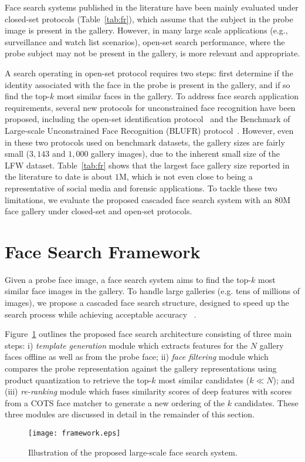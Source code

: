 \documentclass[10pt,journal,compsoc]{IEEEtran}
\begin{document}
Face search systems published in the literature have been mainly evaluated under closed-set protocols (Table~\ref{tab:fr}), which assume that the subject in the probe image is present in the gallery. However, in many large scale applications (e.g., surveillance and watch list scenarios), open-set search performance, where the probe subject may not be present in the gallery, is more relevant and appropriate.

A search operating in open-set protocol requires two steps: first determine if the identity associated with the face in the probe is present in the gallery, and if so find the top-$k$ most similar faces in the gallery. To address face search application requirements, several new protocols for unconstrained face recognition have been proposed, including the open-set identification protocol~\cite{faceretrieval:fusion} and the Benchmark of Large-scale Unconstrained Face Recognition (BLUFR) protocol~\cite{BLUFR}. However, even in these two protocols used on benchmark datasets, the gallery sizes are fairly small ($3,143$ and $1,000$ gallery images), due to the inherent small size of the LFW dataset. Table~\ref{tab:fr} shows that the largest face gallery size reported in the literature to date is about $1$M, which is not even close to being a representative of social media and forensic applications. To tackle these two limitations, we evaluate the proposed cascaded face search system with an $80$M face gallery under closed-set and open-set protocols.

\section{Face Search Framework}
Given a probe face image, a face search system aims to find the top-$k$ most similar face images in the gallery. To handle large galleries (e.g. tens of millions of images), we propose a cascaded face search structure, designed to speed up the search process while achieving acceptable accuracy ~\cite{Zhou19941539, fr:fastmatching}.

Figure~\ref{fig:framework} outlines the proposed face search architecture consisting of three main steps: i) \emph{template generation} module which extracts features for the $N$ gallery faces offline as well as from the probe face; ii) \emph{face filtering} module which compares the probe representation against the gallery representations using product quantization to retrieve the top-$k$ most similar candidates ($k \ll N$); and (iii) \emph{re-ranking} module which fuses similarity scores of deep features with scores from a COTS face matcher to generate a new ordering of the $k$ candidates. These three modules are discussed in detail in the remainder of this section.
\begin{figure}[htpb]
  \centering
  \texttt{[image: framework.eps]}\\
  \caption{Illustration of the proposed large-scale face search system.}\label{fig:framework}
\end{figure}
\end{document}
